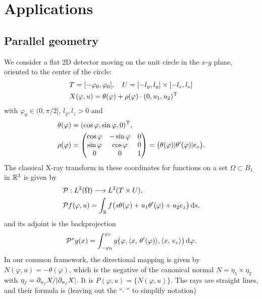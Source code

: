 \documentclass{amsart}
\renewcommand*{\phi}{\varphi}
\begin{document}
\section{Applications}
\label{sec:applications}


\subsection{Parallel geometry}
\label{sec:applications:parbeam}

We consider a flat 2D detector moving on the unit circle in the $x$-$y$ plane, oriented to the center of the circle:
%
\begin{align*}
 & T = [-\phi_0, \phi_0],\quad U = [-l_y, l_y] \times [-l_z, l_z] \\
 & X(\phi, u) = \theta(\phi) + \rho(\phi) \cdot \TRANSP{(0, u_1, u_2)}
\end{align*}
%
with $\phi_0 \in (0, \pi/2]$, $l_y, l_z > 0$ and
%
\begin{align}
 \theta(\phi) &= \TRANSP{(\cos\phi, \sin\phi, 0)}, \\ 
 \rho(\phi) &=
 \begin{pmatrix}
  \cos\phi & -\sin\phi & 0 \\
  \sin\phi & \cos\phi & 0 \\
  0 & 0 & 1
 \end{pmatrix}
 = \big(\theta(\phi) | \theta'(\phi) | e_z\big).
\end{align}
%
The classical X-ray transform in these coordinates for functions on a set $\Omega \subset B_1$ in ${\mathbb{R}}^3$ is given by
%
\begin{align}
 &\OPP: L^2(\Omega) \Lto L^2(T \times U), \notag \\
 \label{eq:parflat:fwdproj}
 &\OPP f(\phi, u) = \int_\RR f\big(s\theta(\phi) + u_1 \theta'(\phi) + u_2 e_z\big)\, \D s,
\end{align}
%
and its adjoint is the backprojection
%
\begin{equation}
 \label{eq:parflat:backproj}
 \DUALOPP g(x) = \int_{-\phi_0}^{\phi_0} g\big(\phi, \INNER{x}{\theta'(\phi)}, \INNER{x}{e_z}\big)\, \D \phi.
\end{equation}
%
In our common framework, the directional mapping is given by $N(\phi, u) = -\theta(\phi)$, which is the negative of the canonical normal 
$N = \eta_1 \times \eta_2$ with $\eta_j = \partial_{u_j} X / |\partial_{u_j} X|$. It is $P(\phi, u) = \lbrace N(\phi, u)\rbrace$.
The rays are straight lines, and their formula is (leaving out the ``$\,\widetilde{\ }\,$'' to simplify notation)
\end{document}
